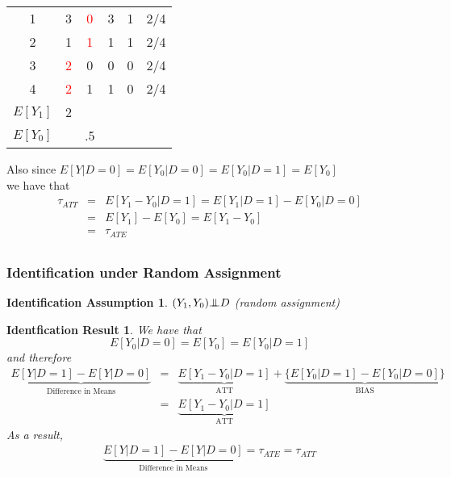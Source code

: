 \documentclass{beamer}
\numberwithin{equation}{section}
\newtheorem{iass}{Identification Assumption}
\newtheorem{ires}{Identfication Result}
\newcommand{\indep}{{\bot\negthickspace\negthickspace\bot}}
\begin{document}
\begin{frame}
\begin{overprint}
\begin{center}
\begin{tabular}{cccccc}
\hline
\rowcolor{gray!10}        1 &          3 &        \textcolor{red}{0} &          3 &          1 & 2/4  \\
\rowcolor{gray!10}         2 &         1 &       \textcolor{red}{1} &          1 &          1  & 2/4 \\
\rowcolor{gray!30}         3 &          \textcolor{red}{2} &         0 &          0 &          0  & 2/4 \\
\rowcolor{gray!30}         4 &          \textcolor{red}{2} &         1 &          1 &          0 & 2/4  \\
\hline
$E[Y_1]$& 2 & & &    \\
$E[Y_0]$&  & .5 &  &    \\
\hline
\end{tabular}
\end{center}
\bigskip
Also since $E[Y|D=0]=E[Y_0|D=0]=E[Y_0|D=1]=E[Y_0]$\\\medskip we have that 
\begin{eqnarray*}
\tau_{ATT} &=&E[Y_1 - Y_0| D=1]=E[Y_1| D=1]-E[Y_0| D=0]\\
&=&E[Y_1]-E[Y_0]=E[Y_1-Y_0]\\
 &=& \tau_{ATE} \\
\end{eqnarray*}
\end{overprint}
\end{frame}


\begin{frame}
  \frametitle{Identification under Random Assignment}

\begin{iass}\scriptsize
$(Y_1,Y_0) \indep D$ (random assignment)
\end{iass}
\vspace{-.1in}
\begin{ires}\scriptsize
We have that\[
E[Y_0|D=0]=E[Y_0]=E[Y_0|D=1]\]
  and therefore
\begin{eqnarray*}
  \underbrace{E[Y|D=1]-E[Y|D=0]}_{\mbox{Difference in Means}} &=& \underbrace{E[Y_1 - Y_0 | D=1]}_{\mbox{ATT}}+\underbrace{\{E[Y_0 | D=1]-E[Y_0 | D=0]\}}_{\mbox{BIAS}} \\
   &=&  \underbrace{E[Y_1 - Y_0 | D=1]}_{\mbox{ATT}}
\end{eqnarray*}
As a result,
\begin{equation}
\begin{split}
\underbrace{E[Y|D=1]-E[Y|D=0]}_{\mbox{Difference in Means}}=\tau_{ATE} = \tau_{ATT}\nonumber
\end{split}
\end{equation}
\end{ires}
\end{frame}
\end{document}
